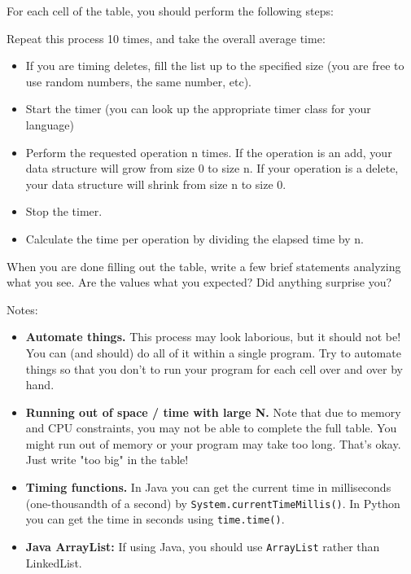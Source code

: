 \documentclass{article}
\begin{document}
\begin{itemize}
    For each cell of the table, you should perform the following steps:
    
    Repeat this process 10 times, and take the overall average time:
        \begin{itemize}
            \item If you are timing deletes, fill the list up to the specified size (you are free to use random numbers, the same number, etc).
            \item Start the timer (you can look up the appropriate timer class for your language)
            \item Perform the requested operation n times. If the operation is an add, your data structure will grow from size 0 to size n. If your operation is a delete, your data structure will shrink from size n to size 0.
            \item Stop the timer.
            \item Calculate the time per operation by dividing the elapsed time by n.
        \end{itemize} 
  
When you are done filling out the table, write a few brief statements analyzing what you see.  Are the values what you expected?  Did anything surprise you? 

Notes:
\begin{itemize}
\item\textbf{ Automate things. }This process may look laborious, but it should not be! You can (and should) do all of it within a single program. Try to automate things so that you don't to run your program for each cell over and over by hand.

\item\textbf{ Running out of space / time with large N.} Note that due to memory and CPU constraints, you may not be able to complete the full table. You might run out of memory or your program may take too long. That's okay. Just write "too big" in the table!

\item \textbf{Timing functions. }In Java you can get the current time in milliseconds (one-thousandth of a second) by \verb|System.currentTimeMillis()|. In Python you can get the time in seconds using \verb|time.time()|.

\item \textbf{Java ArrayList:} If using Java, you should use \verb|ArrayList| rather than LinkedList. 

    
    
    
\end{itemize}
\end{itemize}
\end{document}
